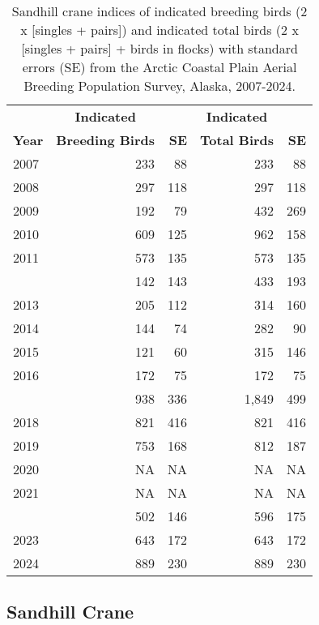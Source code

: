 \documentclass[
]{article}
\begin{document}
\begin{longtable}[t]{lrrrr}

\caption{\label{tbl-SACR}Sandhill crane indices of indicated breeding
birds (2 x {[}singles + pairs{]}) and indicated total birds (2 x
{[}singles + pairs{]} + birds in flocks) with standard errors (SE) from
the Arctic Coastal Plain Aerial Breeding Population Survey, Alaska,
2007-2024.}

\tabularnewline

\\
\toprule
\multicolumn{1}{c}{\textbf{ }} & \multicolumn{1}{c}{\textbf{Indicated}} & \multicolumn{1}{c}{\textbf{ }} & \multicolumn{1}{c}{\textbf{Indicated}} & \multicolumn{1}{c}{\textbf{ }} \\
\cmidrule(l{3pt}r{3pt}){2-2} \cmidrule(l{3pt}r{3pt}){4-4}
\textbf{Year} & \textbf{Breeding Birds} & \textbf{SE} & \textbf{Total Birds} & \textbf{SE}\\
\midrule
2007 & 233 & 88 & 233 & 88\\
2008 & 297 & 118 & 297 & 118\\
2009 & 192 & 79 & 432 & 269\\
2010 & 609 & 125 & 962 & 158\\
2011 & 573 & 135 & 573 & 135\\
\addlinespace
2012 & 142 & 143 & 433 & 193\\
2013 & 205 & 112 & 314 & 160\\
2014 & 144 & 74 & 282 & 90\\
2015 & 121 & 60 & 315 & 146\\
2016 & 172 & 75 & 172 & 75\\
\addlinespace
2017 & 938 & 336 & 1,849 & 499\\
2018 & 821 & 416 & 821 & 416\\
2019 & 753 & 168 & 812 & 187\\
2020 & NA & NA & NA & NA\\
2021 & NA & NA & NA & NA\\
\addlinespace
2022 & 502 & 146 & 596 & 175\\
2023 & 643 & 172 & 643 & 172\\
2024 & 889 & 230 & 889 & 230\\
\bottomrule

\end{longtable}

\endgroup{}

\newpage{}

\subsection*{Sandhill Crane}\label{sandhill-crane-2}
\end{document}
